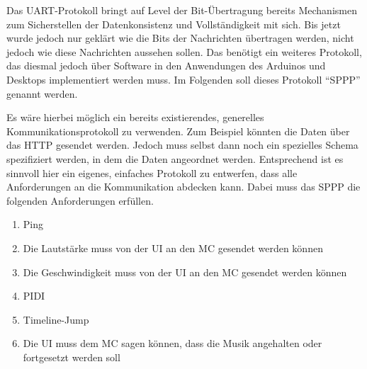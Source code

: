 Das \ac{UART}-Protokoll bringt auf Level der Bit-Übertragung bereits Mechanismen zum Sicherstellen der Datenkonsistenz und Vollständigkeit mit sich. %
Bis jetzt wurde jedoch nur geklärt wie die Bits der Nachrichten übertragen werden, nicht jedoch wie diese Nachrichten aussehen sollen.
Das benötigt ein weiteres Protokoll, das diesmal jedoch über Software in den Anwendungen des Arduinos und Desktops implementiert werden muss.
Im Folgenden soll dieses Protokoll \enquote{\ac{SPPP}} genannt werden.

Es wäre hierbei möglich ein bereits existierendes, generelles Kommunikationsprotokoll zu verwenden.
Zum Beispiel könnten die Daten über das \ac{HTTP} gesendet werden.
Jedoch muss selbst dann noch ein spezielles Schema spezifiziert werden, in dem die Daten angeordnet werden.
Entsprechend ist es sinnvoll hier ein eigenes, einfaches Protokoll zu entwerfen, dass alle Anforderungen an die Kommunikation abdecken kann.
Dabei muss das \ac{SPPP} die folgenden Anforderungen erfüllen.

\begin{enumerate}
    \item Ping %
    \item Die Lautstärke muss von der \ac{UI} an den \ac{MC} gesendet werden können
    \item Die Geschwindigkeit muss von der \ac{UI} an den \ac{MC} gesendet werden können
    \item PIDI %
    \item Timeline-Jump %
    \item Die \ac{UI} muss dem \ac{MC} sagen können, dass die Musik angehalten oder fortgesetzt werden soll
\end{enumerate}







